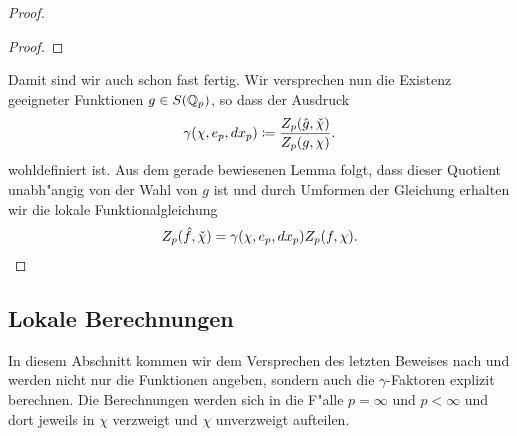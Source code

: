 \begin{proof}
\begin{proof}
		\end{proof}
		Damit sind wir auch schon fast fertig. 
		Wir versprechen nun die Existenz geeigneter Funktionen $g\in S({\mathbb{Q}_p})$, so dass der Ausdruck
		\begin{align*}
			\gamma(\chi, e_p, d{x}_p) \coloneqq  \frac{Z_p(\hat g, \check{\chi})}{Z_p(g, \chi)}.
		\end{align*}
		wohldefiniert ist. 
		Aus dem gerade bewiesenen Lemma folgt, dass dieser Quotient unabh"angig von der Wahl von $g$ ist und durch Umformen der Gleichung erhalten wir die lokale Funktionalgleichung
		\begin{align*}
			Z_p(\hat f, \check{\chi}) = \gamma(\chi, e_p, d{x}_p) Z_p(f, \chi).
		\end{align*}
	\end{proof}
\subsection{Lokale Berechnungen}
	In diesem Abschnitt kommen wir dem Versprechen des letzten Beweises nach und werden nicht nur die Funktionen angeben, sondern auch die $\gamma$-Faktoren explizit berechnen.
	Die Berechnungen werden sich in die F"alle $p=\infty$ und $p<\infty$ und dort jeweils in $\chi$ verzweigt und $\chi$ unverzweigt aufteilen.
